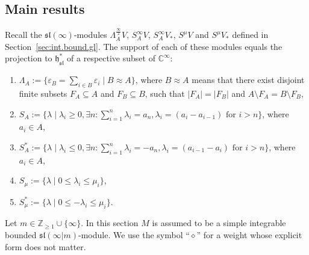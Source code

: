 \documentclass[12pt]{amsart}
\newcommand\C{\mathbb{C}}
\newcommand\Z{\mathbb{Z}}
\newcommand\fh{\mathfrak{h}}
\newcommand\fsl{\mathfrak{sl}}
\theoremstyle{plain}
\theoremstyle{definition}
\numberwithin{equation}{section}
\begin{document}
\subsection{Main results}

Recall the $\fsl(\infty)$-modules $\Lambda_A^{\frac{\infty}{2}}V$, $S_A^\infty V$, $S_A^\infty V_*$, $S^\mu V$ and $S^\mu V_*$ defined in Section~\ref{sec:int.bound.gl}. The support of each of these modules equals the projection to $\fh_\fsl^*$ of a respective subset of $\C^\infty$:
\begin{enumerate} \label{list:types.of.weights}
\item [(i)] \label{list:types.of.weights.exterior}  $\Lambda_A := \{\varepsilon_B=\sum_{i\in B} \varepsilon_i \mid B\approx A\}$, where $B \approx A$ means that there exist disjoint finite subsets $F_A\subseteq A$ and $F_B\subseteq B$, such that $|F_A|=|F_B|$ and $A\setminus F_A = B\setminus F_B$,
\item [(ii)] \label{list:types.of.weights.symmetric}  $S_A := \{\lambda \mid \lambda_i\geq 0, \exists n : \sum_{i=1}^n \lambda_i = a_n, \lambda_i = (a_i - a_{i-1}) \text{ for } i>n\}$, where $a_i\in A$,
\item [(iii)] \label{list:types.of.weights.symmetric.dual}  $S_A^* := \{\lambda \mid \lambda_i\leq 0, \exists n : \sum_{i=1}^n \lambda_i = -a_n, \lambda_i = (a_{i-1} - a_{i}) \text{ for } i>n\}$, where $a_i\in A$,
\item [(iv)] \label{list:types.of.weights.schur}  $S_\mu := \{\lambda \mid 0\leq \lambda_i\leq \mu_i\}$,
\item [(v)] \label{list:types.of.weights.schur.dual}  $S_\mu^* := \{\lambda \mid 0\leq -\lambda_i\leq \mu_i\}$.
\end{enumerate}

Let $m\in \Z_{\geq 1}\cup\{\infty\}$. In this section $M$ is assumed to be a simple integrable bounded $\fsl(\infty|m)$-module. We use the symbol ``$\diamond$'' for a weight whose explicit form does not matter.
\end{document}
